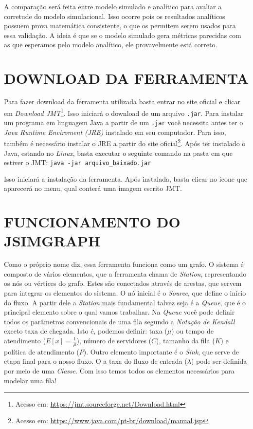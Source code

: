\documentclass{report}
\begin{document}
A comparação será feita entre modelo simulado e analítico para avaliar a corretude do modelo simulacional. Isso ocorre pois os resultados analíticos possuem prova matemática consistente, o que os permitem serem usados para essa validação. A ideia é que se o modelo simulado gera métricas parecidas com as que esperamos pelo modelo analítico, ele provavelmente está correto.

\section{DOWNLOAD DA FERRAMENTA}

Para fazer download da ferramenta utilizada basta entrar no site oficial e clicar em \textit{Download JMT}\footnote{Acesso em: \url{https://jmt.sourceforge.net/Download.html}}. Isso iniciará o download de um arquivo \texttt{.jar}. Para instalar um programa em linguagem Java a partir de um \texttt{.jar} você necessita antes ter o \textit{Java Runtime Enviroment (JRE)} instalado em seu computador. Para isso, também é necessário instalar o JRE a partir do site oficial\footnote{Acesso em: \url{https://www.java.com/pt-br/download/manual.jsp}}. Após ter instalado o Java, estando no \textit{Linux}, basta executar o seguinte comando na pasta em que estiver o JMT: \texttt{java -jar arquivo\_baixado.jar }

Isso iniciará a instalação da ferramenta. Após instalada, basta clicar no icone que aparecerá no menu, qual conterá uma imagem escrito JMT.

\section{FUNCIONAMENTO DO JSIMGRAPH}
Como o próprio nome diz, essa ferramenta funciona como um grafo. O sistema é composto de vários elementos, que a ferramenta chama de \textit{Station}, representando os nós ou vértices do grafo. Estes são conectados através de arestas, que servem para integrar os elementos do sistema. O nó inicial é o \textit{Source}, que define o início do fluxo. A partir dele a \textit{Station} mais fundamental talvez seja é a \textit{Queue}, que é o principal elemento sobre o qual vamos trabalhar. Na \textit{Queue} você pode definir todos os parâmetros convencionais de uma fila segundo a \textit{Notação de Kendall} exceto taxa de chegada. Isto é, podemos definir: taxa ($\mu$) ou tempo de atendimento ($E[x] = \frac{1}{\mu}$), número de servidores ($C$), tamanho da fila ($K$) e política de atendimento ($P$). Outro elemento importante é o \textit{Sink}, que serve de etapa final para o nosso fluxo. O a taxa do fluxo de entrada ($\lambda$) pode ser definida por meio de uma \textit{Classe}. Com isso temos todos os elementos necessários para modelar uma fila!
\end{document}
